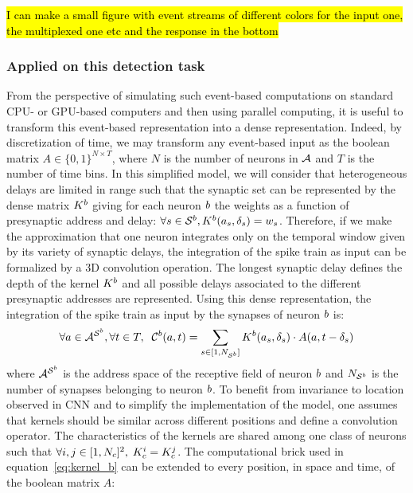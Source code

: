 \documentclass[default]{sn-jnl}%
\theoremstyle{thmstyleone}%
\theoremstyle{thmstyletwo}%
\theoremstyle{thmstylethree}%
\newcommand{\note}[1]{{\sethlcolor{yellow}\hl{#1}}}
\begin{document}
\note{I can make a small figure with event streams of different colors for the input one, the multiplexed one etc and the response in the bottom}

\subsubsection{Applied on this detection task}

From the perspective of simulating such event-based computations on standard CPU- or GPU-based computers and then using parallel computing, it is useful to transform this event-based representation into a dense representation. Indeed, by discretization of time, we may transform any event-based input as the boolean matrix $A \in \{0, 1 \}^{N\times T}$, where $N$ is the number of neurons in $\mathcal{A}$ and $T$ is the number of time bins. In this simplified model, we will consider that heterogeneous delays are limited in range such that the synaptic set can be represented by the dense matrix $K^b$ giving for each neuron $b$ the weights as a function of presynaptic address and delay: $\forall {s\in \mathcal{S}^b}, K^b(a_s, \delta_s) = w_s$. Therefore, if we make the approximation that one neuron integrates only on the temporal window given by its variety of synaptic delays, the integration of the spike train as input can be formalized by a 3D convolution operation. The longest synaptic delay defines the depth of the kernel $K^b$ and all possible delays associated to the different presynaptic addresses are represented. Using this dense representation, the integration of the spike train as input by the synapses of neuron $b$ is:
%
\begin{equation}\label{eq:kernel_b}
\forall a \in \mathcal{A}^{\mathcal{S}^b}, \forall t \in T, \; \;
\mathcal{C}^b(a,t)
= \sum_{s  \in [1, N_{\mathcal{S}^b}]} K^b(a_s, \delta_s) \cdot A(a, t-\delta_s)
\end{equation}
%
where $\mathcal{A}^{\mathcal{S}^b}$ is the address space of the receptive field of neuron $b$ and $N_{\mathcal{S}^b}$ is the number of synapses belonging to neuron $b$. To benefit from invariance to location observed in CNN and to simplify the implementation of the model, one assumes that kernels should be similar across different positions and define a convolution operator. The characteristics of the kernels are shared among one class of neurons such that $\forall i,j \in [1, N_c]^2, \; K^i_c = K^j_c$. The computational brick used in equation~\eqref{eq:kernel_b} can be extended to every position, in space and time, of the boolean matrix $A$:
\end{document}
